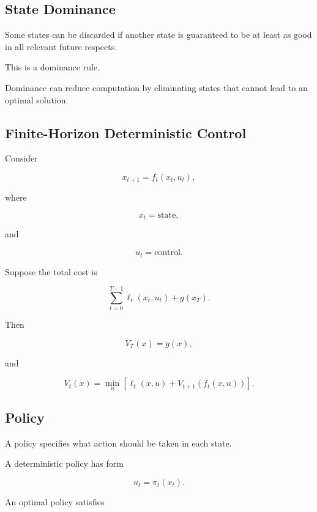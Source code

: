 \subsection{State Dominance}
\label{subsec:state-dominance}

Some states can be discarded if another state is guaranteed to be at
least as good in all relevant future respects.

This is a dominance rule.

Dominance can reduce computation by eliminating states that cannot lead to
an optimal solution.

\subsection{Finite-Horizon Deterministic Control}
\label{subsec:finite-horizon-deterministic-control}

Consider

\[
\boxed{
x_{t+1}
=
f_t(x_t,u_t),
}
\]

where

\[
x_t
=
\text{state},
\]

and

\[
u_t
=
\text{control}.
\]

Suppose the total cost is

\[
\boxed{
\sum_{t=0}^{T-1}
\ell_t(x_t,u_t)
+
g(x_T).
}
\]

Then

\[
\boxed{
V_T(x)=g(x),
}
\]

and

\[
\boxed{
V_t(x)
=
\min_u
\left[
\ell_t(x,u)
+
V_{t+1}
(
f_t(x,u)
)
\right].
}
\]

\subsection{Policy}
\label{subsec:dynamic-programming-policy}

A policy specifies what action should be taken in each state.

A deterministic policy has form

\[
\boxed{
u_t
=
\pi_t(x_t).
}
\]

An optimal policy satisfies

